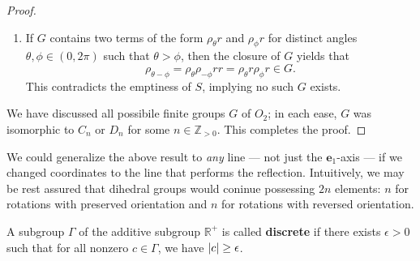 \documentclass[11pt]{article}
\renewcommand{\vec}[1]{\mathbf{#1}}
\begin{document}
\begin{adjustwidth}{1cm}{}
\begin{proof}
\begin{enumerate}
		\item If $G$ contains two terms of the form $\rho_{\theta} r$ and $\rho_{\phi} r$ for distinct angles $\theta, \phi \in (0, 2\pi)$ such that $\theta > \phi$, then the closure of $G$ yields that
		\[
			\rho_{\theta - \phi} = \rho_{\theta} \rho_{-\phi} r r = \rho_{\theta} r \rho_{\phi} r \in G.
		\]
		This contradicts the emptiness of $S$, implying no such $G$ exists.
	\end{enumerate}
	We have discussed all possibile finite groups $G$ of $O_{2}$; in each ease, $G$ was isomorphic to $C_{n}$ or $D_{n}$ for some $n \in \mathbb{Z}_{> 0}$. This completes the proof.
	\end{proof}
\end{adjustwidth}

We could generalize the above result to \textit{any} line --- not just the $\vec{e}_{1}$-axis --- if we changed coordinates to the line that performs the reflection. Intuitively, we may be rest assured that dihedral groups would coninue possessing $2n$ elements: $n$ for rotations with preserved orientation and $n$ for rotations with reversed orientation.

A subgroup $\Gamma$ of the additive subgroup $\mathbb{R}^{+}$ is called \textbf{discrete} if there exists $\epsilon > 0$ such that for all nonzero $c \in \Gamma$, we have $\abs{c} \ge \epsilon$.
\end{document}
